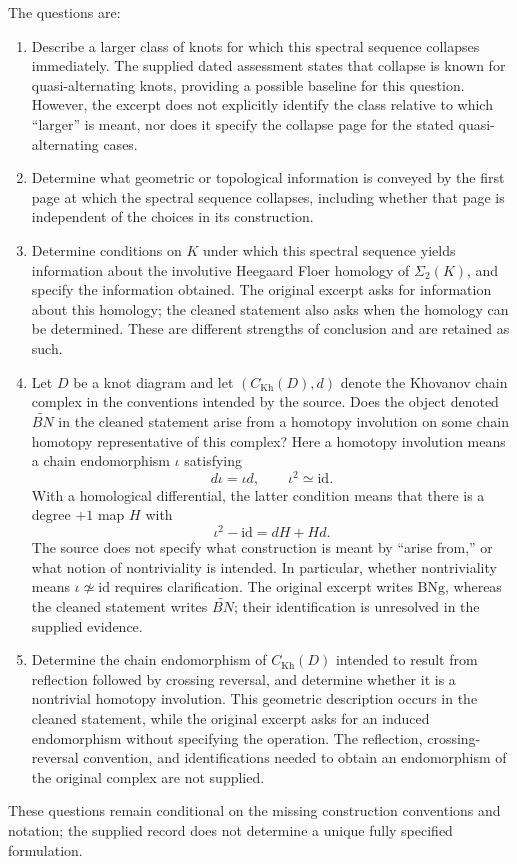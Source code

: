 \documentclass[11pt]{article}
\begin{document}
The questions are:
\begin{enumerate}
\item Describe a larger class of knots for which this spectral sequence collapses immediately. The supplied dated assessment states that collapse is known for quasi-alternating knots, providing a possible baseline for this question. However, the excerpt does not explicitly identify the class relative to which ``larger'' is meant, nor does it specify the collapse page for the stated quasi-alternating cases.
\item Determine what geometric or topological information is conveyed by the first page at which the spectral sequence collapses, including whether that page is independent of the choices in its construction.
\item Determine conditions on \(K\) under which this spectral sequence yields information about the involutive Heegaard Floer homology of \(\Sigma_2(K)\), and specify the information obtained. The original excerpt asks for information about this homology; the cleaned statement also asks when the homology can be determined. These are different strengths of conclusion and are retained as such.
\item Let \(D\) be a knot diagram and let \((C_{\mathrm{Kh}}(D),d)\) denote the Khovanov chain complex in the conventions intended by the source. Does the object denoted \(\widetilde{BN}\) in the cleaned statement arise from a homotopy involution on some chain homotopy representative of this complex? Here a homotopy involution means a chain endomorphism \(\iota\) satisfying
\[
 d\iota=\iota d,\qquad \iota^2\simeq\mathrm{id}.
\]
With a homological differential, the latter condition means that there is a degree \(+1\) map \(H\) with
\[
 \iota^2-\mathrm{id}=dH+Hd.
\]
The source does not specify what construction is meant by ``arise from,'' or what notion of nontriviality is intended. In particular, whether nontriviality means \(\iota\not\simeq\mathrm{id}\) requires clarification. The original excerpt writes \(\mathrm{BNg}\), whereas the cleaned statement writes \(\widetilde{BN}\); their identification is unresolved in the supplied evidence.
\item Determine the chain endomorphism of \(C_{\mathrm{Kh}}(D)\) intended to result from reflection followed by crossing reversal, and determine whether it is a nontrivial homotopy involution. This geometric description occurs in the cleaned statement, while the original excerpt asks for an induced endomorphism without specifying the operation. The reflection, crossing-reversal convention, and identifications needed to obtain an endomorphism of the original complex are not supplied.
\end{enumerate}
These questions remain conditional on the missing construction conventions and notation; the supplied record does not determine a unique fully specified formulation.
\end{document}
